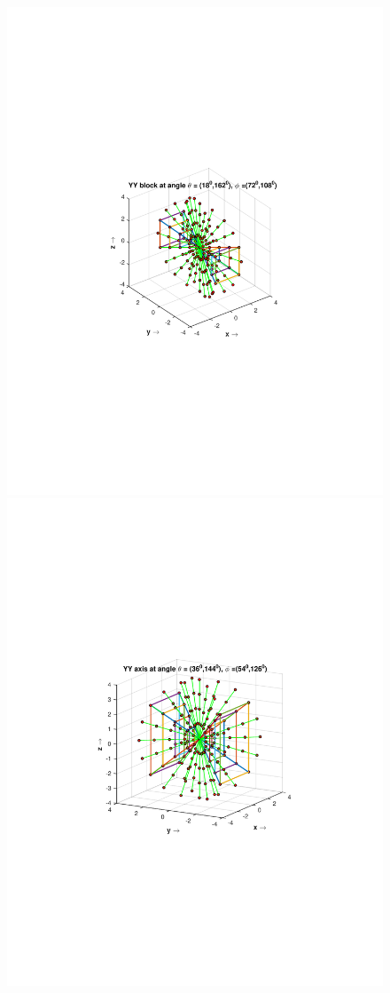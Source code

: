 \documentclass{UCF_ETD}
\begin{document}
\begin{figure}[H]
\begin{center}
 \includegraphics[scale=0.54]{PolarSphericalDFT/YYBlockLevel1}
 \includegraphics[scale=0.53]{PolarSphericalDFT/YYBlockLevel22}

\end{center}
\end{figure}
\end{document}
